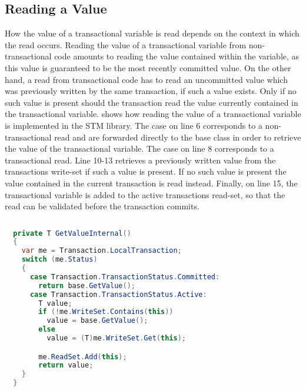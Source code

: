 \subsection{Reading a Value}
\label{sec:stm_imple_internal_detials_read}
How the value of a transactional variable is read depends on the context in which the read occurs. Reading the value of a transactional variable from non-transactional code amounts to reading the value contained within the variable, as this value is guaranteed to be the most recently committed value. On the other hand, a read from transactional code has to read an uncommitted value which was previously written by the same transaction, if such a value exists. Only if no such value is present should the transaction read the value currently contained in the transactional variable.  shows how reading the value of a transactional variable is implemented in the \ac{STM} library. The case on line 6 corresponds to a non-transactional read and are forwarded directly to the base class in order to retrieve the value of the transactional variable. The case on line 8 corresponds to a transactional read. Line 10-13 retrieves a previously written value from the transactions write-set if such a value is present. If no such value is present the value contained in the current transaction is read instead. Finally, on line 15, the transactional variable is added to the active transactions read-set, so that the read can be validated before the transaction commits.
\begin{lstlisting}[label=lst:library_read_value,
  caption={Reading a Transactional Variable},
  language=Java,  
  showspaces=false,
  showtabs=false,
  breaklines=true,
  showstringspaces=false,
  breakatwhitespace=true,
  commentstyle=\color{greencomments},
  keywordstyle=\color{bluekeywords},
  stringstyle=\color{redstrings},
  morekeywords={atomic, retry, orElse, var, get, set}]  % Start your code-block
  
  private T GetValueInternal()
  {
    var me = Transaction.LocalTransaction;
    switch (me.Status)
    {
      case Transaction.TransactionStatus.Committed:
        return base.GetValue();
      case Transaction.TransactionStatus.Active:
        T value;
        if (!me.WriteSet.Contains(this))
          value = base.GetValue();
        else
          value = (T)me.WriteSet.Get(this);

        me.ReadSet.Add(this);
        return value;
    }
  }
\end{lstlisting}

